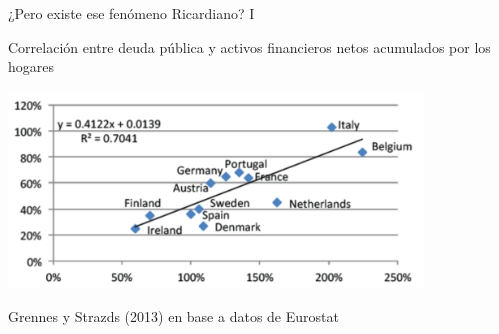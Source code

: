 \documentclass{beamer}
\begin{document}



    
    




\begin{frame}{¿Pero existe ese fenómeno Ricardiano? I}

     \begin{center}
         Correlación entre deuda pública y activos financieros netos acumulados por los hogares
     \end{center}

     \centering\includegraphics[width=11cm]{P91b.png}\  

     \begin{center}
         Grennes y Strazds (2013) en base a datos de Eurostat
     \end{center}

\end{frame}
\end{document}

